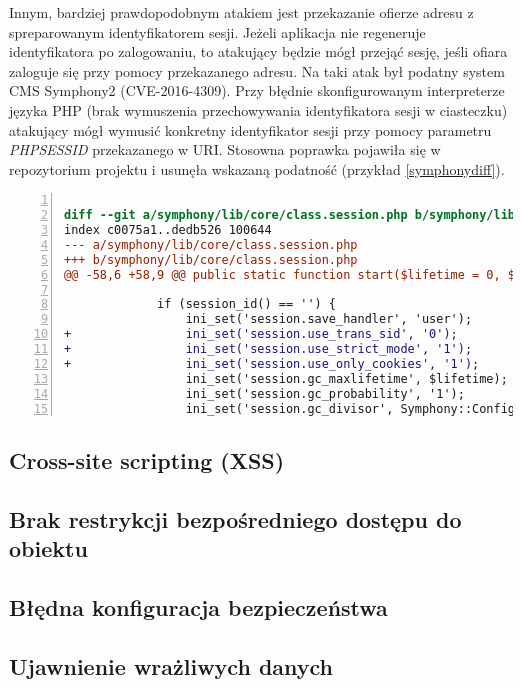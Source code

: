 \documentclass[11pt,a4paper,polish,thesis,oneside]{dcsbook}
\begin{document}
Innym, bardziej prawdopodobnym atakiem jest przekazanie ofierze adresu z spreparowanym identyfikatorem sesji. Jeżeli aplikacja nie regeneruje identyfikatora po zalogowaniu, to atakujący będzie mógł przejąć sesję, jeśli ofiara zaloguje się przy pomocy przekazanego adresu. Na taki atak był podatny system CMS Symphony2 (CVE-2016-4309). Przy błędnie skonfigurowanym interpreterze języka PHP (brak wymuszenia przechowywania identyfikatora sesji w ciasteczku) atakujący mógł wymusić konkretny identyfikator sesji przy pomocy parametru \textit{PHPSESSID} przekazanego w URI. Stosowna poprawka pojawiła się w repozytorium projektu i usunęła wskazaną podatność (przykład \ref{symphonydiff}).

\begin{lstlisting}[language=diff,frame=single,caption=łatka naprawiająca podatność fiksacji sesji w Symphony2 \cite{symphony},label=symphonydiff,numbers=left]

diff --git a/symphony/lib/core/class.session.php b/symphony/lib/core/class.session.php
index c0075a1..dedb526 100644
--- a/symphony/lib/core/class.session.php
+++ b/symphony/lib/core/class.session.php
@@ -58,6 +58,9 @@ public static function start($lifetime = 0, $path = '/', $domain = null, $httpOn
 
             if (session_id() == '') {
                 ini_set('session.save_handler', 'user');
+                ini_set('session.use_trans_sid', '0');
+                ini_set('session.use_strict_mode', '1');
+                ini_set('session.use_only_cookies', '1');
                 ini_set('session.gc_maxlifetime', $lifetime);
                 ini_set('session.gc_probability', '1');
                 ini_set('session.gc_divisor', Symphony::Configuration()->get('session_gc_divisor', 'symphony'));
\end{lstlisting}

\subsection{Cross-site scripting (XSS)}
\subsection{Brak restrykcji bezpośredniego dostępu do obiektu}
\subsection{Błędna konfiguracja bezpieczeństwa}
\subsection{Ujawnienie wrażliwych danych}
\end{document}
